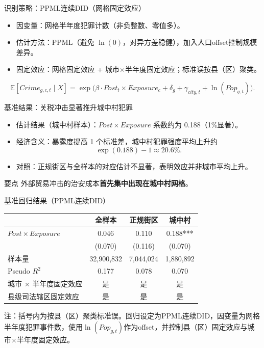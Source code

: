 \documentclass[aspectratio=169,10pt]{ctexbeamer}
\begin{document}
\begin{frame}{识别策略：PPML连续DID（网格固定效应）}
  \begin{itemize}
    \item 因变量：网格半年度犯罪计数（非负整数、零值多）。
    \item 估计方法：PPML（避免 $\ln(0)$，对异方差稳健），加入人口offset控制规模差异。
    \item 固定效应：网格固定效应 + 城市$\times$半年度固定效应；标准误按县（区）聚类。
  \end{itemize}
  \vspace{-0.2em}
  \begin{equation*}
  \mathbb{E}[Crime_{g,c,t}\mid X]
  =\exp\Big(\beta\cdot Post_t\times Exposure_c+\delta_g+\gamma_{city,t}+\ln(Pop_{g,t})\Big).
  \end{equation*}
\end{frame}

\begin{frame}{基准结果：关税冲击显著推升城中村犯罪}
  \begin{itemize}
    \item 估计结果（城中村样本）：$Post\times Exposure$ 系数约为 0.188（1\%显著）。
    \item 经济含义：暴露度提高 1 个标准差，城中村犯罪强度平均上升约
      \[
        \exp(0.188)-1 \approx 20.6\%.
      \]
    \item 对照：正规街区与全样本的对应估计不显著，表明效应并非城市平均上升。
  \end{itemize}
  \vspace{0.5em}
  \begin{block}{要点}
    外部贸易冲击的治安成本\textbf{首先集中出现在城中村网格}。
  \end{block}
\end{frame}

\begin{frame}[plain]{基准回归结果（PPML连续DID）}
  \centering
  \scriptsize
  \begin{tabular}{lccc}
    \toprule
     & 全样本 & 正规街区 & 城中村 \\
    \midrule
    $Post\times Exposure$ & 0.046 & 0.110 & 0.188*** \\
     & (0.070) & (0.116) & (0.070) \\
    \addlinespace[1pt]
    样本量 & 32,900,832 & 7,044,024 & 1,880,892 \\
    Pseudo $R^2$ & 0.177 & 0.078 & 0.070 \\
    城市 $\times$ 半年度固定效应 & 是 & 是 & 是 \\
    县级司法辖区固定效应 & 是 & 是 & 是 \\
    \bottomrule
  \end{tabular}
  
  \vspace{0.5em}
  \parbox{0.93\textwidth}{\footnotesize 注：括号内为按县（区）聚类标准误。回归设定为PPML连续DID，因变量为网格半年度犯罪事件数，使用$\ln(Pop_{g,t})$作为offset，并控制县（区）固定效应与城市$\times$半年度固定效应。}
\end{frame}
\end{document}
